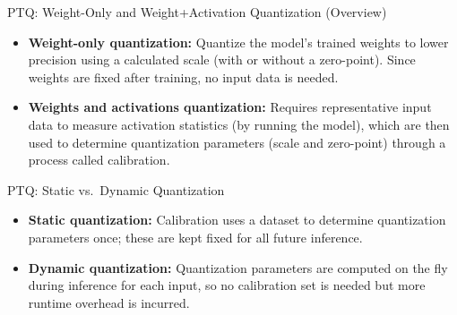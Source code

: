 \begin{frame}{PTQ: Weight-Only and Weight+Activation Quantization (Overview)}
  \begin{itemize}\itemsep0.32em
    \item[\textcolor{red}{$\blacktriangleright$}] \textbf{Weight-only quantization:}
      Quantize the model's trained weights to lower precision using a calculated scale (with or without a zero-point). Since weights are fixed after training, no input data is needed.
    \item[\textcolor{red}{$\blacktriangleright$}] \textbf{Weights and activations quantization:}
      Requires representative input data to measure activation statistics (by running the model), which are then used to determine quantization parameters (scale and zero-point) through a process called calibration.
  \end{itemize}
\end{frame}

\begin{frame}{PTQ: Static vs.\ Dynamic Quantization}
  \begin{itemize}\itemsep0.32em
    \item[\textcolor{red}{$\blacktriangleright$}] \textbf{Static quantization:} 
    Calibration uses a dataset to determine quantization parameters once; these are kept fixed for all future inference.
    \item[\textcolor{red}{$\blacktriangleright$}] \textbf{Dynamic quantization:} 
    Quantization parameters are computed on the fly during inference for each input, so no calibration set is needed but more runtime overhead is incurred.
  \end{itemize}
\end{frame}

